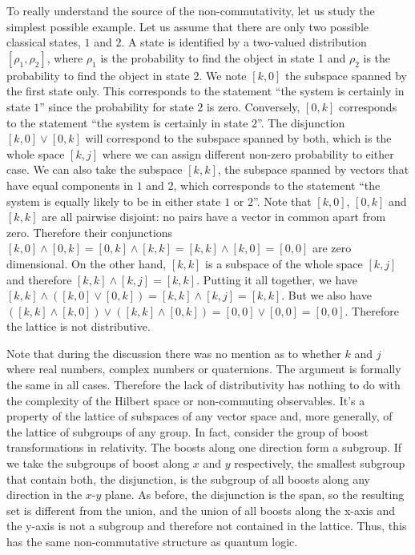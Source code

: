 \documentclass[11pt, executivepaper]{article}
\begin{document}
To really understand the source of the non-commutativity, let us study the simplest possible example. Let us assume that there are only two possible classical states, $1$ and $2$. A state is identified by a two-valued distribution $[\rho_1, \rho_2]$, where $\rho_1$ is the probability to find the object in state 1 and $\rho_2$ is the probability to find the object in state 2. We note $[k,0]$ the subspace spanned by the first state only. This corresponds to the statement ``the system is certainly in state $1$'' since the probability for state $2$ is zero. Conversely, $[0,k]$ corresponds to the statement ``the system is certainly in state $2$''. The disjunction $[k,0] \vee [0,k]$ will correspond to the subspace spanned by both, which is the whole space $[k,j]$ where we can assign different non-zero probability to either case. We can also take the subspace $[k,k]$, the subspace spanned by vectors that have equal components in $1$ and $2$, which corresponds to the statement ``the system is equally likely to be in either state $1$ or $2$''. Note that $[k,0]$, $[0,k]$ and $[k,k]$ are all pairwise disjoint: no pairs have a vector in common apart from zero. Therefore their conjunctions $[k,0] \wedge [0,k] = [0,k] \wedge [k,k] = [k,k] \wedge [k,0] = [0,0]$ are zero dimensional. On the other hand, $[k,k]$ is a subspace of the whole space $[k,j]$ and therefore $[k,k] \wedge [k,j] = [k,k]$. Putting it all together, we have $[k,k] \wedge ( [k,0] \vee [0,k] ) = [k,k] \wedge [k,j] = [k,k]$. But we also have $( [k,k] \wedge [k,0] ) \vee ( [k,k] \wedge [0,k] ) = [0,0] \vee [0,0] = [0,0]$. Therefore the lattice is not distributive.

Note that during the discussion there was no mention as to whether $k$ and $j$ where real numbers, complex numbers or quaternions. The argument is formally the same in all cases. Therefore the lack of distributivity has nothing to do with the complexity of the Hilbert space or non-commuting observables. It's a property of the lattice of subspaces of any vector space and, more generally, of the lattice of subgroups of any group. In fact, consider the group of boost transformations in relativity. The boosts along one direction form a subgroup. If we take the subgroups of boost along $x$ and $y$ respectively, the smallest subgroup that contain both, the disjunction, is the subgroup of all boosts along any direction in the $x$-$y$ plane. As before, the disjunction is the span, so the resulting set is different from the union, and the union of all boosts along the x-axis and the y-axis is not a subgroup and therefore not contained in the lattice. Thus, this has the same non-commutative structure as quantum logic.
\end{document}
